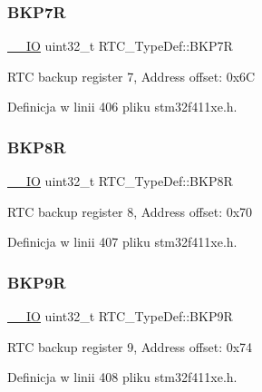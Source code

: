 \subsubsection{\texorpdfstring{B\+K\+P7R}{BKP7R}}
{\footnotesize\ttfamily \hyperlink{core__sc300_8h_aec43007d9998a0a0e01faede4133d6be}{\+\_\+\+\_\+\+IO} uint32\+\_\+t R\+T\+C\+\_\+\+Type\+Def\+::\+B\+K\+P7R}

R\+TC backup register 7, Address offset\+: 0x6C 

Definicja w linii 406 pliku stm32f411xe.\+h.

\mbox{\label{struct_r_t_c___type_def_a0e7fca11f1c953270ee0ee6028860add}} 
\subsubsection{\texorpdfstring{B\+K\+P8R}{BKP8R}}
{\footnotesize\ttfamily \hyperlink{core__sc300_8h_aec43007d9998a0a0e01faede4133d6be}{\+\_\+\+\_\+\+IO} uint32\+\_\+t R\+T\+C\+\_\+\+Type\+Def\+::\+B\+K\+P8R}

R\+TC backup register 8, Address offset\+: 0x70 

Definicja w linii 407 pliku stm32f411xe.\+h.

\mbox{\label{struct_r_t_c___type_def_abadf1ac26350bf00575428be6a05708b}} 
\subsubsection{\texorpdfstring{B\+K\+P9R}{BKP9R}}
{\footnotesize\ttfamily \hyperlink{core__sc300_8h_aec43007d9998a0a0e01faede4133d6be}{\+\_\+\+\_\+\+IO} uint32\+\_\+t R\+T\+C\+\_\+\+Type\+Def\+::\+B\+K\+P9R}

R\+TC backup register 9, Address offset\+: 0x74 

Definicja w linii 408 pliku stm32f411xe.\+h.

\mbox{\label{struct_r_t_c___type_def_a2403d29b2bfffb734ebef6642c0d2724}} 
